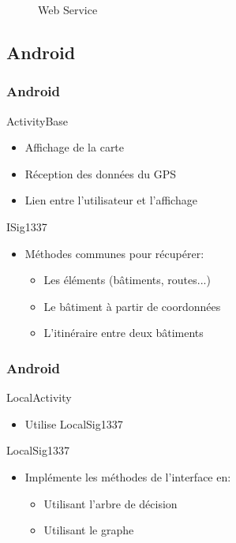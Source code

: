 \documentclass{beamer}
\begin{document}
\begin{frame}
\begin{figure}
\centering
{}
\caption{Web Service}
\end{figure}
\end{frame}

\subsection{Android}
\begin{frame}
\frametitle{Android}
\begin{block}{ActivityBase}
\begin{itemize}
\item Affichage de la carte
\item Réception des données du GPS
\item Lien entre l'utilisateur et l'affichage
\end{itemize}
\end{block}
\begin{block}{ISig1337}
\begin{itemize}
\item Méthodes communes pour récupérer:\begin{itemize}
\item Les éléments (bâtiments, routes...)
\item Le bâtiment à partir de coordonnées
\item L'itinéraire entre deux bâtiments
\end{itemize}
\end{itemize}
\end{block}
\end{frame}

\begin{frame}
\frametitle{Android}
\begin{block}{LocalActivity}
\begin{itemize}
\item Utilise LocalSig1337
\end{itemize}
\end{block}
\begin{block}{LocalSig1337}
\begin{itemize}
\item Implémente les méthodes de l'interface en:\begin{itemize}
\item Utilisant l'arbre de décision
\item Utilisant le graphe
\end{itemize}
\end{itemize}
\end{block}
\end{frame}
\end{document}
